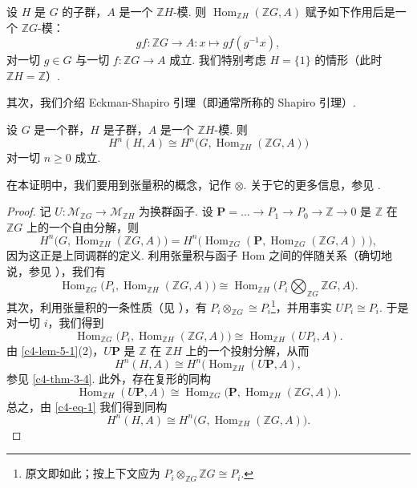 \begin{remark}\label{c4-rem-5-3}
设 $H$ 是 $G$ 的子群，$A$ 是一个 $\mathbb ZH$-模. 则 $\operatorname{Hom}_{\mathbb ZH}(\mathbb ZG, A)$ 赋予如下作用后是一个 $\mathbb ZG$-模：
\[
gf:\mathbb ZG\to A:x\mapsto gf(g^{-1}x),
\]
对一切 $g\in G$ 与一切 $f:\mathbb ZG\to A$ 成立. 我们特别考虑 $H=\{1\}$ 的情形（此时 $\mathbb ZH=\mathbb Z$）.
\end{remark}

其次，我们介绍 Eckman-Shapiro 引理（即通常所称的 Shapiro 引理）.

\begin{theorem}\label{c4-thm-5-2}
设 $G$ 是一个群，$H$ 是子群，$A$ 是一个 $\mathbb ZH$-模. 则
\[
H^n(H, A)\cong H^n\bigl(G, \operatorname{Hom}_{\mathbb ZH}(\mathbb ZG, A)\bigr)
\]
对一切 $n\geq 0$ 成立.
\end{theorem}

在本证明中，我们要用到张量积的概念，记作 $\otimes$. 关于它的更多信息，参见 \cite[\S2.2]{rot09}.

\begin{proof}
记 $U:\mathscr{M}_{\mathbb ZG}\to\mathscr{M}_{\mathbb ZH}$ 为换群函子. 设 $\mathbf P=\ldots\to P_1\to P_0\to\mathbb Z\to 0$ 是 $\mathbb Z$ 在 $\mathbb ZG$ 上的一个自由分解，则
\[
H^n\bigl(G, \operatorname{Hom}_{\mathbb ZH}(\mathbb ZG, A)\bigr)=H^n\bigl(\operatorname{Hom}_{\mathbb ZG}(\mathbf P, \operatorname{Hom}_{\mathbb ZG}(\mathbb ZG, A))\bigr),
\]
因为这正是上同调群的定义. 利用张量积与函子 Hom 之间的伴随关系（确切地说，参见 \cite[Theorem~2.75, \S2.2]{rot09}），我们有
\[
\operatorname{Hom}_{\mathbb ZG}\bigl(P_i, \operatorname{Hom}_{\mathbb ZH}(\mathbb ZG, A)\bigr)\cong\operatorname{Hom}_{\mathbb ZH}\bigl(P_i\bigotimes_{\mathbb ZG}\mathbb ZG, A\bigr).
\]
其次，利用张量积的一条性质（见 \cite[Proposition~2.58, \S2.2]{rot09}），有 $P_i\otimes_{\mathbb ZG}\cong P_i$\footnote{原文即如此；按上下文应为 $P_i\otimes_{\mathbb ZG}\mathbb ZG\cong P_i$.}，并用事实 $UP_i\cong P_i$. 于是对一切 $i$，我们得到
\[
\operatorname{Hom}_{\mathbb ZG}\bigl(P_i, \operatorname{Hom}_{\mathbb ZH}(\mathbb ZG, A)\bigr)\cong\operatorname{Hom}_{\mathbb ZH}(UP_i, A).
\]
由 \autoref{c4-lem-5-1}(2)，$U\mathbf P$ 是 $\mathbb Z$ 在 $\mathbb ZH$ 上的一个投射分解，从而
\[
H^n(H, A)\cong H^n(\operatorname{Hom}_{\mathbb ZH}(U\mathbf P, A),
\]
参见 \autoref{c4-thm-3-4}. 此外，存在复形的同构
\begin{equation}\label{c4-eq-1}
\operatorname{Hom}_{\mathbb ZH}(U\mathbf P, A)\cong\operatorname{Hom}_{\mathbb ZG}\bigl(\mathbf P, \operatorname{Hom}_{\mathbb ZH}(\mathbb ZG, A)\bigr).
\end{equation}
总之，由 \eqref{c4-eq-1} 我们得到同构
\[
H^n(H, A)\cong H^n\bigl(G, \operatorname{Hom}_{\mathbb ZH}(\mathbb ZG, A)\bigr).
\]
\end{proof}

